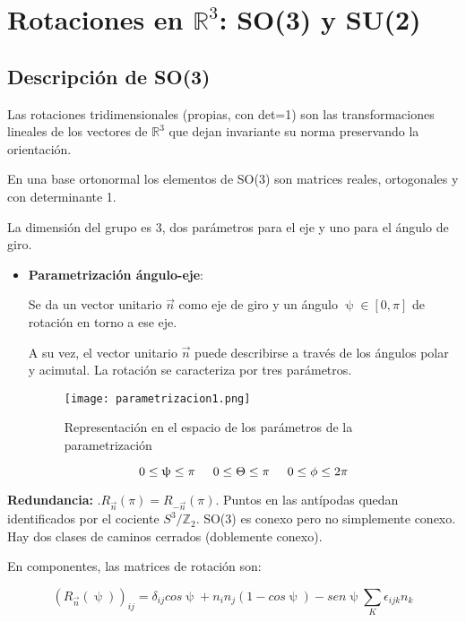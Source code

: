 
\section{Rotaciones en $\mathds{R}^3$: SO(3) y SU(2)}

\subsection{Descripción de SO(3)}

Las rotaciones tridimensionales (propias, con det=1) son las transformaciones lineales de los vectores de $\mathds{R}^3$ que dejan invariante su norma preservando la orientación.

En una base ortonormal los elementos de SO(3) son matrices reales, ortogonales y con determinante 1.

La dimensión del grupo es 3, dos parámetros para el eje y uno para el ángulo de giro.

\begin{itemize}
\item \textbf{Parametrización ángulo-eje}:

Se da un vector unitario $\Vec{n}$ como eje de giro y un ángulo $\uppsi \in [0,\pi]$ de rotación en torno a ese eje.

A su vez, el vector unitario $\Vec{n}$ puede describirse a través de los ángulos polar y acimutal. La rotación se caracteriza por tres parámetros.


\begin{figure}[h!]
\centering
\texttt{[image: parametrizacion1.png]}
\caption{Representación en el espacio de los parámetros de la parametrización}
\label{fig:my_label}
\end{figure}

$$0\leq \uppsi \leq \pi \hspace{0.5cm} 0\leq \Theta \leq \pi \hspace{0.5cm}  0\leq \phi \leq 2\pi $$

\end{itemize}
\textbf{Redundancia:} .$R_{\Vec{n}}(\pi) = R_{-\Vec{n}}(\pi) $. Puntos en las antípodas quedan identificados por el cociente $S^3/\mathds{Z}_2$. SO(3) es conexo pero no simplemente conexo. Hay dos clases de caminos cerrados (doblemente conexo).

En componentes, las matrices de rotación son:

$$(R_{\Vec{n}}(\uppsi))_{ij}=\delta _{ij} cos \uppsi + n_in_j (1-cos \uppsi) - sen \uppsi \sum _K \epsilon _{ijk} n_k$$

